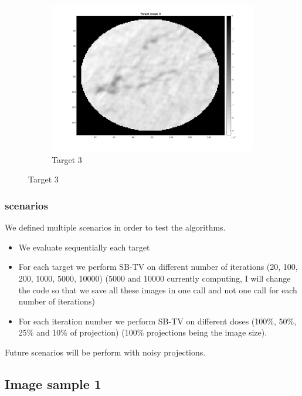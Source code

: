 \documentclass[10pt,a4paper,titlepage]{article}
\begin{document}
\begin{figure}[H]
        	\begin{subfigure}[b]{0.32\textwidth}  
            	\centering 
            	\includegraphics[width=\textwidth]{Sample3/target3.png}
            	\caption{Target 3}    
            	\label{subfig:FBP1Fully}
        	\end{subfigure}
        \end{figure}
		
		\subsubsection{scenarios}
			We defined multiple scenarios in order to test the algorithms. 
			\begin{itemize}
				\item We evaluate sequentially each target
				\item For each target we perform SB-TV on different number of iterations (20, 100, 200, 1000, 5000, 10000) (5000 and 10000 currently computing, I will change the code so that we save all these images in one call and not one call for each number of iterations)
				\item For each iteration number we perform SB-TV on different doses (100\%, 50\%, 25\% and 10\% of projection) (100\% projections being the image size).
			\end{itemize}					
			Future scenarios will be perform with noisy projections.
\clearpage

	\subsection{Image sample 1}
\end{document}
